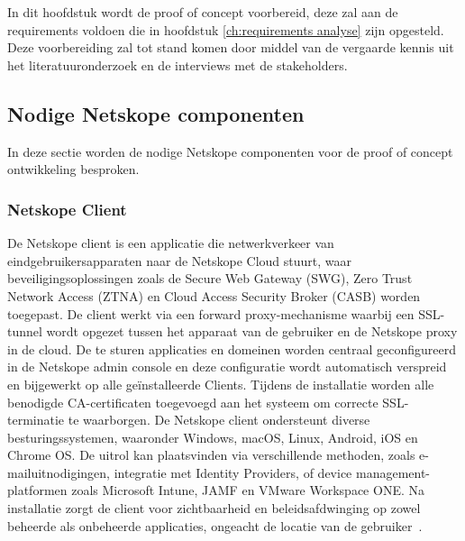 
\chapter{}%
\label{ch:proof of concept preparation}

In dit hoofdstuk wordt de proof of concept voorbereid, deze zal aan de requirements voldoen die in hoofdstuk \ref{ch:requirements analyse} zijn opgesteld. Deze voorbereiding zal tot stand komen door middel van de vergaarde kennis uit het literatuuronderzoek en de interviews met de stakeholders.

\section{Nodige Netskope componenten}

In deze sectie worden de nodige Netskope componenten voor de proof of concept ontwikkeling besproken.

\subsection{Netskope Client}
De Netskope client is een applicatie die netwerkverkeer van eindgebruikersapparaten naar de Netskope Cloud stuurt, waar beveiligingsoplossingen zoals de Secure Web Gateway (SWG), Zero Trust Network Access (ZTNA) en Cloud Access Security Broker (CASB) worden toegepast. De client werkt via een forward proxy-mechanisme waarbij een SSL-tunnel wordt opgezet tussen het apparaat van de gebruiker en de Netskope proxy in de cloud. De te sturen applicaties en domeinen worden centraal geconfigureerd in de Netskope admin console en deze configuratie wordt automatisch verspreid en bijgewerkt op alle geïnstalleerde Clients. Tijdens de installatie worden alle benodigde CA-certificaten toegevoegd aan het systeem om correcte SSL-terminatie te waarborgen.
De Netskope client ondersteunt diverse besturingssystemen, waaronder Windows, macOS, Linux, Android, iOS en Chrome OS. De uitrol kan plaatsvinden via verschillende methoden, zoals e-mailuitnodigingen, integratie met Identity Providers, of device management-platformen zoals Microsoft Intune, JAMF en VMware Workspace ONE. Na installatie zorgt de client voor zichtbaarheid en beleidsafdwinging op zowel beheerde als onbeheerde applicaties, ongeacht de locatie van de gebruiker~\autocite{Netskope2025-8}.

